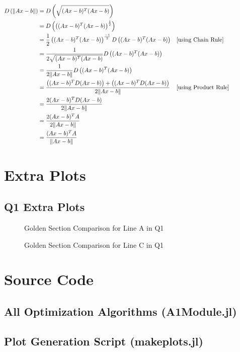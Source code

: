 \documentclass{article}
\begin{document}
    \begin{align*}
        D\left( \| Ax-b \| \right) &= D \left( \sqrt{(Ax-b)^T (Ax-b)} \right) \\
        &= D \left( \left( (Ax-b)^T (Ax-b) \right)^{\frac{1}{2}} \right) \\
        &= \frac{1}{2} \left((Ax-b)^T (Ax-b) \right)^{\frac{-1}{2}} D \left( (Ax-b)^T (Ax-b) \right) & \parbox[c]{0.4\linewidth}{[using Chain Rule]} \\
        &= \frac{1}{2 \sqrt { (Ax-b)^T (Ax-b) }} D \left( (Ax-b)^T (Ax-b) \right) \\
        &= \frac{1}{2 \| Ax-b \| } D \left( (Ax-b)^T (Ax-b) \right) \\
        &= \frac{ \left( (Ax-b)^T D(Ax-b) \right) + \left( (Ax-b)^T D(Ax-b) \right) }{2 \| Ax-b \| } & \parbox[c]{0.4\linewidth}{[using Product Rule]} \\
        &= \frac{ 2(Ax-b)^T D(Ax-b) }{2 \| Ax-b \| } \\
        &= \frac{ 2(Ax-b)^T A }{2 \| Ax-b \| } \\
        &= \frac{ (Ax-b)^T A }{\| Ax-b \| }
    \end{align*}

    \appendix
    \section{Extra Plots}

    \subsection{Q1 Extra Plots}

    \begin{figure}[H]
        \centering
        
        \caption{Golden Section Comparison for Line A in Q1}
    \end{figure}
    
    \begin{figure}[H]
        \centering
        
        \caption{Golden Section Comparison for Line C in Q1}
    \end{figure}

    \section{Source Code}

    \subsection{All Optimization Algorithms (A1Module.jl)}


    \subsection{Plot Generation Script (makeplots.jl)}


    
\end{document}
